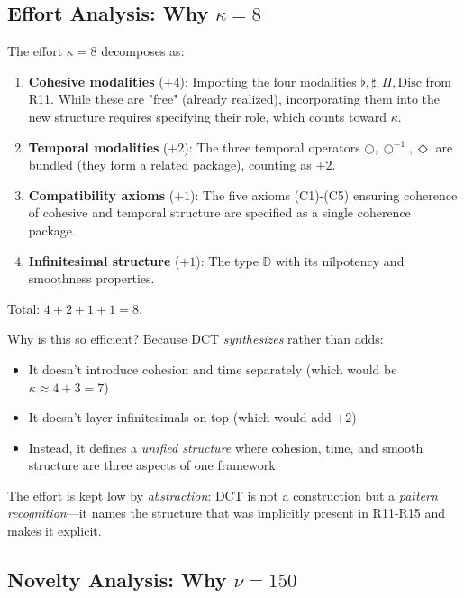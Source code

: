 \documentclass[11pt]{article}
\theoremstyle{definition}
\begin{document}
\subsection{Effort Analysis: Why $\kappa = 8$}

The effort $\kappa = 8$ decomposes as:

\begin{enumerate}
\item \textbf{Cohesive modalities} ($+4$): Importing the four modalities $\flat, \sharp, \Pi, \text{Disc}$ from R11. While these are "free" (already realized), incorporating them into the new structure requires specifying their role, which counts toward $\kappa$.

\item \textbf{Temporal modalities} ($+2$): The three temporal operators $\bigcirc, \bigcirc^{-1}, \Diamond$ are bundled (they form a related package), counting as $+2$.

\item \textbf{Compatibility axioms} ($+1$): The five axioms (C1)-(C5) ensuring coherence of cohesive and temporal structure are specified as a single coherence package.

\item \textbf{Infinitesimal structure} ($+1$): The type $\mathbb{D}$ with its nilpotency and smoothness properties.
\end{enumerate}

Total: $4 + 2 + 1 + 1 = 8$.

Why is this so efficient? Because DCT \emph{synthesizes} rather than adds:
\begin{itemize}
\item It doesn't introduce cohesion and time separately (which would be $\kappa \approx 4 + 3 = 7$)
\item It doesn't layer infinitesimals on top (which would add $+2$)
\item Instead, it defines a \emph{unified structure} where cohesion, time, and smooth structure are three aspects of one framework
\end{itemize}

The effort is kept low by \emph{abstraction}: DCT is not a construction but a \emph{pattern recognition}—it names the structure that was implicitly present in R11-R15 and makes it explicit.

\subsection{Novelty Analysis: Why $\nu = 150$}
\end{document}
